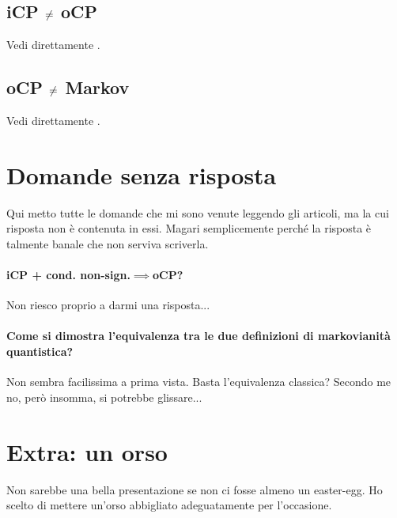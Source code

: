 \documentclass[a4]{article}
\begin{document}
\subsection[iCP non è equivalente a oCP]
           {iCP \(\centernot=\) oCP} \label{cont:icpocp}
Vedi direttamente \cite{CPdoesnotimply}.

\subsection[oCP non è equivalente a Markoviano]
           {oCP \(\centernot=\) Markov} \label{cont:ocpmar}
Vedi direttamente \cite{CPdoesnotimply}.

\section{Domande senza risposta}
Qui metto tutte le domande che mi sono venute leggendo gli articoli, ma la cui risposta
non è contenuta in essi. Magari semplicemente perché la risposta è talmente
banale che non serviva scriverla.
\paragraph{iCP + cond. non-sign.\(\implies\)oCP?} 
Non riesco proprio a darmi una risposta...

\paragraph{Come si dimostra l'equivalenza tra le due definizioni di markovianità quantistica?}
Non sembra facilissima a prima vista. Basta l'equivalenza classica? Secondo me no, però
insomma, si potrebbe glissare... 

\printbibliography

\section{Extra: un orso}
Non sarebbe una bella presentazione se non ci fosse almeno un easter-egg. Ho scelto
di mettere un'orso abbigliato adeguatamente per l'occasione.
~
\begin{figure}[h!]
	\centering
	\resizebox{0.9\textwidth}{!}{}
\end{figure}
	
\end{document}
